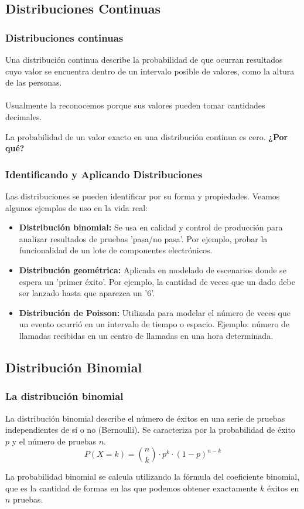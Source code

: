 \documentclass[aspectratio=169]{beamer}
\begin{document}
\subsection{Distribuciones Continuas}
\begin{frame}
\frametitle{Distribuciones continuas}
Una distribución continua describe la probabilidad de que ocurran resultados cuyo valor se encuentra dentro de un intervalo posible de valores, como la altura de las personas.\\~\\


Usualmente la reconocemos porque sus valores pueden tomar cantidades decimales.

\vfill

La probabilidad de un valor exacto en una distribución continua es cero. {\bf ¿Por qué?}
\end{frame}



\begin{frame}
\frametitle{Identificando y Aplicando Distribuciones}
Las distribuciones se pueden identificar por su forma y propiedades. Veamos algunos ejemplos de uso en la vida real:

\begin{itemize}
    \item \textbf{Distribución binomial:} Se usa en calidad y control de producción para analizar resultados de pruebas 'pasa/no pasa'. Por ejemplo, probar la funcionalidad de un lote de componentes electrónicos.
    \item \textbf{Distribución geométrica:} Aplicada en modelado de escenarios donde se espera un 'primer éxito'. Por ejemplo, la cantidad de veces que un dado debe ser lanzado hasta que aparezca un '6'.
    \item \textbf{Distribución de Poisson:} Utilizada para modelar el número de veces que un evento ocurrió en un intervalo de tiempo o espacio. Ejemplo: número de llamadas recibidas en un centro de llamadas en una hora determinada.
\end{itemize}
\end{frame}


\subsection{Distribución Binomial}
\begin{frame}
\frametitle{La distribución binomial}
La distribución binomial describe el número de éxitos en una serie de pruebas independientes de sí o no (Bernoulli). Se caracteriza por la probabilidad de éxito \(p\) y el número de pruebas \(n\).
\[
P(X=k) = \binom{n}{k} \cdot p^k \cdot (1-p)^{n-k}
\]

\vfill

La probabilidad binomial se calcula utilizando la fórmula del coeficiente binomial, que es la cantidad de formas en las que podemos obtener exactamente \(k\) éxitos en \(n\) pruebas.
\end{frame}
\end{document}
